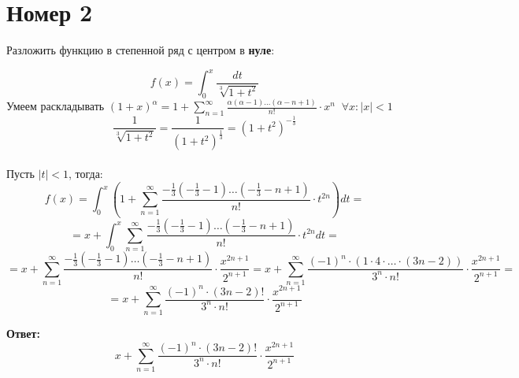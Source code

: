 \documentclass[a4paper,12pt]{article}
\begin{document}
\section*{Номер 2}
\begin{center}
Разложить функцию в степенной ряд с центром в \textbf{нуле}:
\end{center}
\[
f(x) = \int_{0}^{x} \frac{dt}{\sqrt[3]{1 + t^2}}
\]
Умеем раскладывать $(1 + x)^{\alpha} = 1 + \sum\limits_{n = 1}^{\infty} \frac{\alpha(\alpha - 1) \ldots (\alpha -n + 1)}{n!} \cdot x^n \; \; \forall x : |x| < 1$
\[
\frac{1}{\sqrt[3]{1 + t^2}} = \frac{1}{(1+t^2)^{\frac13}} = (1+t^2)^{-\frac13}
\]
\\
Пусть $|t| < 1$, тогда:
\[
f(x) = \int_{0}^{x} \left(1 + \sum_{n = 1}^{\infty} \frac{-\frac13(-\frac13 - 1) \ldots (-\frac13 -n + 1)}{n!} \cdot t^{2n} \right)dt  =
\]
\[
= x + \int_{0}^{x} \sum_{n = 1}^{\infty} \frac{-\frac13(-\frac13 - 1) \ldots (-\frac13 -n + 1)}{n!} \cdot t^{2n}dt = 
\]
\[
= 
x + \sum_{n = 1}^{\infty} \frac{-\frac13(-\frac13 - 1) \ldots (-\frac13 -n + 1)}{n!} \cdot  \frac{x^{2n+1}}{2^{n+1}} = x + \sum_{n = 1 }^{\infty} \frac{(-1)^n \cdot (1 \cdot 4 \cdot  \ldots \cdot (3n-2))}{3^n \cdot n!} \cdot \frac{x^{2n+1}}{2^{n+1}} = 
\]
\[
=
x + \sum_{n = 1 }^{\infty} \frac{(-1)^n \cdot (3n-2)!}{3^n \cdot n!} \cdot \frac{x^{2n+1}}{2^{n+1}} 
\]
\begin{center}
\textbf{Ответ: } 
\[
x + \sum_{n = 1 }^{\infty} \frac{(-1)^n \cdot (3n-2)!}{3^n \cdot n!} \cdot \frac{x^{2n+1}}{2^{n+1}} 
\]
\end{center}
\end{document}
